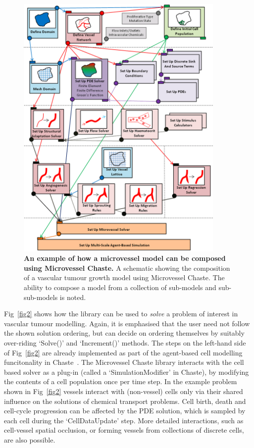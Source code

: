 \documentclass[10pt,letterpaper]{article}
\begin{document}
\begin{figure}[!h]
\centering
\includegraphics[width=0.9\textwidth]{Fig1.png}
\caption{{\bf An example of how a microvessel model can be composed using Microvessel Chaste.}
A schematic showing the composition of a vascular tumour growth model using Microvessel Chaste. The ability to compose a model from a collection of sub-models and sub-sub-models is noted.}
\label{fig1}
\end{figure}

Fig~\ref{fig2} shows how the library can be used to \emph{solve} a problem of interest in vascular tumour modelling. Again, it is emphasised that the user need not follow the shown solution ordering, but can decide on ordering themselves by suitably over-riding `Solve()' and `Increment()' methods. The steps on the left-hand side of Fig~\ref{fig2} are already implemented as part of the agent-based cell modelling funcitonality in Chaste~\cite{Mirams2013}. The Microvessel Chaste library interacts with the cell based solver as a plug-in (called a `SimulationModifier' in Chaste), by modifying the contents of a cell population once per time step. In the example problem shown in Fig~\ref{fig2} vessels interact with (non-vessel) cells only via their shared influence on the solutions of chemical transport problems. Cell birth, death and cell-cycle progression can be affected by the PDE solution, which is sampled by each cell during the `CellDataUpdate' step. More detailed interactions, such as cell-vessel spatial occlusion, or forming vessels from collections of discrete cells, are also possible.
\end{document}

